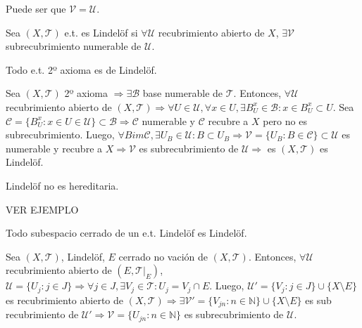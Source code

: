 \begin{obs}
  Puede ser que $ \mathcal{V} = \mathcal{U}$.
\end{obs}

\begin{defn}[Lindelöf]
  Sea $ ( X, \mathcal{T} )$ e.t. es Lindelöf si $\forall \mathcal{U}$ recubrimiento abierto de $X$, $\exists \mathcal{V}$ subrecubrimiento numerable de $\mathcal{U}$.
\end{defn}

\begin{prop}
  Todo e.t. 2º axioma es de Lindelöf.
\end{prop}

\begin{dem}
  Sea $( X, \mathcal{T} )$ 2º axioma $\Rightarrow \exists \mathcal{B}$ base numerable de $\mathcal{T}$. Entonces, $\forall \mathcal{U}$ recubrimiento abierto de $( X, \mathcal{T} ) \Rightarrow \forall U \in \mathcal{U}, \forall x \in U, \exists B_{U}^{x} \in \mathcal{B}: x \in B_{U}^{x} \subset U$. Sea $\mathcal{C} = \{ B_{U}^{x} : x \in U \in \mathcal{U}\}\subset \mathcal{B} \Rightarrow \mathcal{C}$ numerable y $\mathcal{C}$ recubre a $X$ pero no es subrecubrimiento. Luego, $\forall B im \mathcal{C}, \exists U_{B} \in \mathcal{U} : B \subset U_{B} \Rightarrow \mathcal{V} = \{ U_{B} : B \in \mathcal{C} \} \subset \mathcal{U}$ es numerable y recubre a $X \Rightarrow \mathcal{V}$ es subrecubrimiento de $\mathcal{U} \Rightarrow $ es $( X, \mathcal{T} )$ es Lindelöf.
\end{dem}

\begin{obs}
  Lindelöf no es hereditaria.
\end{obs}

\begin{ejm}
  VER EJEMPLO
\end{ejm}

\begin{prop}
  Todo subespacio cerrado de un e.t. Lindelöf es Lindelöf.
\end{prop}

\begin{dem}
  Sea $( X, \mathcal{T} )$, Lindelöf, $E$ cerrado no vación de $( X, \mathcal{T} )$. Entonces, $\forall \mathcal{U}$ recubrimiento abierto de $( E, \mathcal{T}|_{E})$, $\mathcal{U} = \{  U_{j} : j \in J \} \Rightarrow \forall j \in J, \exists V_{j} \in \mathcal{T} : U_{j} = V_{j} \cap E$. Luego, $ \mathcal{U}' = \{ V_{j} : j \in J \} \cup \{ X \setminus E \}$ es recubrimiento abierto de $( X, \mathcal{T} ) \Rightarrow \exists \mathcal{V}' = \{ V_{jn} : n \in \mathbb{N} \} \cup \{ X \setminus E \}$ es sub recubrimiento de $\mathcal{U}' \Rightarrow \mathcal{V} = \{  U_{jn} : n \in \mathbb{N} \}$ es subrecubrimiento de $\mathcal{U}$.
\end{dem}

